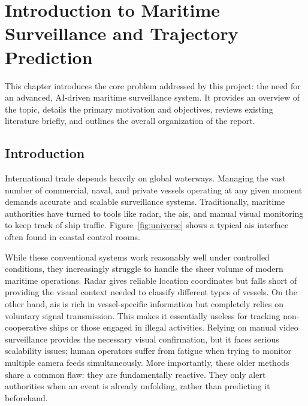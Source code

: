 \chapter{Introduction to Maritime Surveillance and Trajectory Prediction}

This chapter introduces the core problem addressed by this project: the need for an advanced, AI-driven maritime surveillance system. It provides an overview of the topic, details the primary motivation and objectives, reviews existing literature briefly, and outlines the overall organization of the report.

\section{Introduction}
International trade depends heavily on global waterways. Managing the vast number of commercial, naval, and private vessels operating at any given moment demands accurate and scalable surveillance systems. Traditionally, maritime authorities have turned to tools like radar, the \gls{ais}, and manual visual monitoring to keep track of ship traffic. Figure~\ref{fig:universe} shows a typical \gls{ais} interface often found in coastal control rooms.

While these conventional systems work reasonably well under controlled conditions, they increasingly struggle to handle the sheer volume of modern maritime operations. Radar gives reliable location coordinates but falls short of providing the visual context needed to classify different types of vessels. On the other hand, \gls{ais} is rich in vessel-specific information but completely relies on voluntary signal transmission. This makes it essentially useless for tracking non-cooperative ships or those engaged in illegal activities. Relying on manual video surveillance provides the necessary visual confirmation, but it faces serious scalability issues; human operators suffer from fatigue when trying to monitor multiple camera feeds simultaneously. More importantly, these older methods share a common flaw: they are fundamentally reactive. They only alert authorities when an event is already unfolding, rather than predicting it beforehand.

